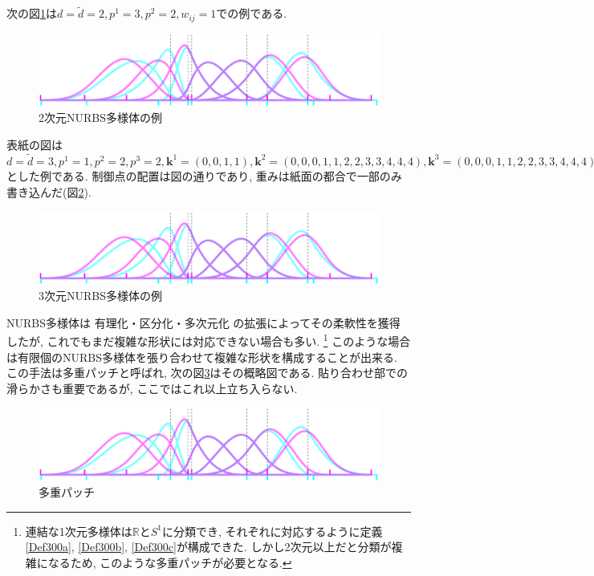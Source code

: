 \documentclass{jsarticle}
\newcommand\setR{\mathbb{R}}
\theoremstyle{definition}%
\begin{document}
次の図\ref{Fig501}は$d=\tilde{d}=2, p^1=3, p^2=2, w_{ij}=1$での例である.
\begin{figure}[H]
	\centering
    \includegraphics[page=4,clip,width=120mm]{figA.pdf}
    \caption{2次元NURBS多様体の例}
	\label{Fig501}
\end{figure}

\newpage
表紙の図は$d=\tilde{d}=3, p^1=1, p^2=2, p^3=2, \bm{k}^1=(0,0,1,1), \bm{k}^2=(0,0,0,1,1,2,2,3,3,4,4,4), \bm{k}^3=(0,0,0,1,1,2,2,3,3,4,4,4)$とした例である.
制御点の配置は図の通りであり, 重みは紙面の都合で一部のみ書き込んだ(図\ref{Fig502}).
\begin{figure}[H]
	\centering
    \includegraphics[page=5,clip,width=130mm]{figA.pdf}
    \caption{3次元NURBS多様体の例}
	\label{Fig502}
\end{figure}
NURBS多様体は 有理化・区分化・多次元化 の拡張によってその柔軟性を獲得したが, これでもまだ複雑な形状には対応できない場合も多い.%
\footnote{連結な1次元多様体は$\setR$と$S^1$に分類でき, それぞれに対応するように定義\ref{Def300a}, \ref{Def300b}, \ref{Def300c}が構成できた. しかし2次元以上だと分類が複雑になるため, このような多重パッチが必要となる.}
このような場合は有限個のNURBS多様体を張り合わせて複雑な形状を構成することが出来る.
この手法は多重パッチと呼ばれ, 次の図\ref{Fig503}はその概略図である.
貼り合わせ部での滑らかさも重要であるが, ここではこれ以上立ち入らない.
\begin{figure}[H]
	\centering
    \includegraphics[page=9,clip,width=140mm]{figA.pdf}
    \caption{多重パッチ}
	\label{Fig503}
\end{figure}

\newpage
\end{document}

